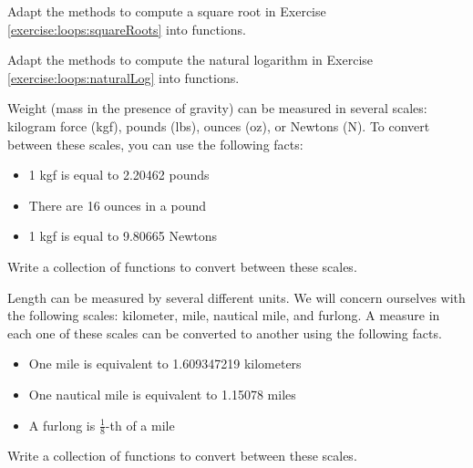 \begin{exer}
Adapt the methods to compute a square root in Exercise 
\ref{exercise:loops:squareRoots} into functions.
\end{exer}

\begin{exer}
Adapt the methods to compute the natural logarithm in Exercise 
\ref{exercise:loops:naturalLog} into functions.
\end{exer}

\begin{exer}
Weight (mass in the presence of gravity) can be measured in 
several scales: kilogram force (kgf), pounds (lbs), ounces (oz), or 
Newtons (N).  To convert between these scales, you can use the following facts:

\begin{itemize}
  \item 1 kgf is equal to 2.20462 pounds
  \item There are 16 ounces in a pound
  \item 1 kgf is equal to 9.80665 Newtons
\end{itemize}

Write a collection of functions to convert between these scales.
\end{exer}

\begin{exer}
Length can be measured by several different units.  We will concern 
ourselves with the following scales: kilometer, mile, nautical mile, and 
furlong.  A measure in each one of these scales can be converted to 
another using the following facts.
\begin{itemize}
  \item One mile is equivalent to 1.609347219 kilometers
  \item One nautical mile is equivalent to 1.15078 miles
  \item A furlong is $\frac{1}{8}$-th of a mile
\end{itemize}
Write a collection of functions to convert between these scales.
\end{exer}

